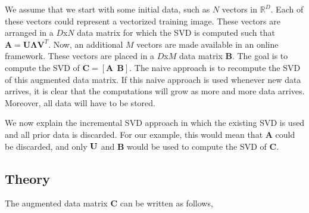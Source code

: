 We assume that we start with some initial data, such as $N$ vectors in $\mathbb{R}^D$.  Each of these vectors could represent a vectorized training image.  These vectors are arranged in a $D$x$N$ data matrix for which the SVD is computed such that $\mathbf{A}=\mathbf{U}\mathbf{\Lambda}\mathbf{V}^T$.  Now, an additional $M$ vectors are made available in an online framework.  These vectors are placed in a $D$x$M$ data matrix $\mathbf{B}$.  The goal is to compute the SVD of $\mathbf{C} = [\mathbf{A} \ \ \mathbf{B}]$.  The naive approach is to recompute the SVD of this augmented data matrix.  If this naive approach is used whenever new data arrives, it is clear that the computations will grow as more and more data arrives.  Moreover, all data will have to be stored.

We now explain the incremental SVD approach in which the existing SVD is used and all prior data is discarded.  For our example, this would mean that $\mathbf{A}$ could be discarded, and only ${\color{darkgreen}}\mathbf{U}$ and $\mathbf{B}$ would be used to compute the SVD of $\mathbf{C}$.

\subsection{Theory}
The augmented data matrix $\mathbf{C}$ can be written as follows,

